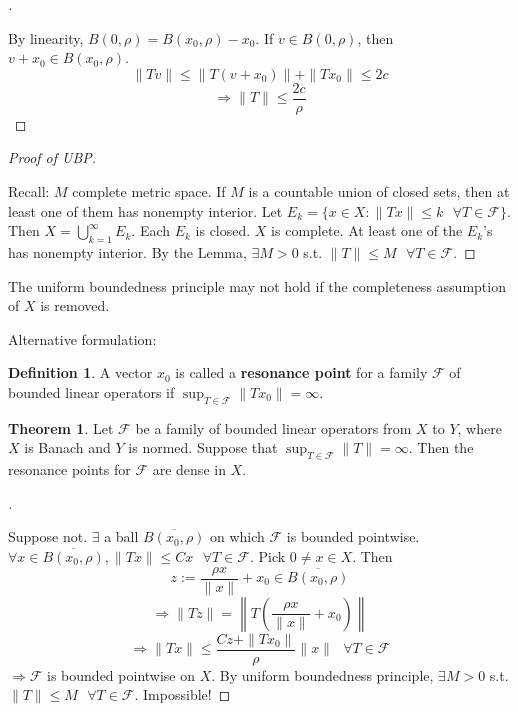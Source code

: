 \documentclass{article}
\newcommand{\sfa}{\text{  } \forall}
\theoremstyle{definition}
\newtheorem{thm}{Theorem}
\newtheorem{dfn}{Definition}
\newenvironment{proofs}[1][\proofname]{%
  \begin{proof}[#1]$ $\par\nobreak\ignorespaces
}{%
  \end{proof}
}
\begin{document}
\begin{proofs}
	By linearity, $B(0, \rho) = B(x_0, \rho) - x_0$.
	If $v \in B(0, \rho)$, then $v + x_0 \in B(x_0, \rho)$.
	\[
		\|T v \| \leq \|T(v + x_0)\| + \|T x_0 \| \leq 2c
	\]
	\[
		\Rightarrow \|T\| \leq \frac{2c}{\rho}
	\]
\end{proofs}

\begin{proofs}[Proof of UBP]
	Recall: $M$ complete metric space.
	If $M$ is a countable union of closed sets, then at least one of them has nonempty interior.
	Let $E_k = \{x \in X: \|T x \| \leq k \sfa T \in \mathcal{F}\}$.
	Then $X = \bigcup_{k = 1}^\infty E_k$.
	Each $E_k$ is closed.
	$X$ is complete.
	At least one of the $E_k$'s has nonempty interior.
	By the Lemma, $\exists M > 0$ s.t. $\|T \| \leq M \sfa T \in \mathcal{F}$.
\end{proofs}

The uniform boundedness principle may not hold if the completeness assumption of $X$ is removed.
\par Alternative formulation:

\begin{dfn}
	A vector $x_0$ is called a \textbf{resonance point} for a family $\mathcal{F}$ of bounded linear operators if $\sup_{T \in \mathcal{F}} \|T x_0\| = \infty$.
\end{dfn}

\begin{thm}
	Let $\mathcal{F}$ be a family of bounded linear operators from $X$ to $Y$, where $X$ is Banach and $Y$ is normed.
	Suppose that $\sup_{T \in \mathcal{F}} \|T\| = \infty$.
	Then the resonance points for $\mathcal{F}$ are dense in $X$.
\end{thm}

\begin{proofs}
	Suppose not.
	$\exists$ a ball $\overline{B(x_0, \rho)}$ on which $\mathcal{F}$ is bounded pointwise.
	$\forall x \in \overline{B(x_0, \rho)}, \|T x\| \leq C x \sfa T \in \mathcal{F}$.
	Pick $0 \neq x \in X$.
	Then 
	\[
		z := \frac{\rho x}{\|x\|} + x_0 \in \overline{B(x_0, \rho)}
	\]
	\[
		\Rightarrow \|T z \| = \left\|T\left(\frac{\rho x}{\|x\|} + x_0 \right) \right\|
	\]
	\[
		\Rightarrow \|T x\| \leq \frac{C z+ \|T x_0\|}{\rho} \|x\| \sfa T \in \mathcal{F}
	\]
	$\Rightarrow \mathcal{F}$ is bounded pointwise on $X$.
	By uniform boundedness principle, $\exists M > 0$ s.t. $\|T\| \leq M \sfa T \in \mathcal{F}$. Impossible!
\end{proofs}
\end{document}
